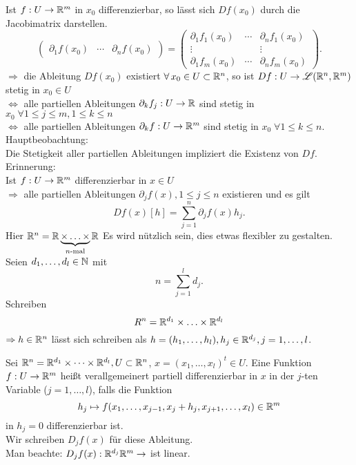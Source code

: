 \documentclass[../ana2.tex]{subfiles}
\begin{document}
Ist \(f:U\rightarrow \mathbb{R}^m \) in \(x_0\) differenzierbar, so lässt 
sich \(Df(x_0)\) durch die Jacobimatrix darstellen.
\[ \begin{pmatrix}
    \partial_1 f(x_0) & \cdots & \partial_n f(x_0)
\end{pmatrix} = \begin{pmatrix}
    \partial_1 f_1(x_0) & \cdots & \partial_n f_1(x_0) \\
    \vdots && \vdots \\
    \partial_1 f_m(x_0) & \cdots & \partial_n f_m(x_0)
\end{pmatrix}. \]
\( \Rightarrow \) die Ableitung \( Df(x_0) \) existiert 
\( \forall x_0 \in U \subset \R^n \), so ist 
\( Df:U\rightarrow \mathscr{L}(\mathbb{R}^n, \mathbb{R}^m) \) 
stetig in \( x_0 \in U \) \\
\( \Leftrightarrow \) alle partiellen Ableitungen 
\( \partial_k f_j:U\rightarrow \mathbb{R} \) sind stetig in 
\(x_0 \; \forall 1 \leq j \leq m, 1 \leq k \leq n \) \\
\( \Leftrightarrow \) alle partiellen Ableitungen 
\( \partial_k f:U\rightarrow \mathbb{R}^m \)
sind stetig in \(x_0 \; \forall 1 \leq k \leq n\).
Hauptbeobachtung:\\
Die Stetigkeit aller partiellen Ableitungen 
impliziert die Existenz von \(Df\).\\
Erinnerung: \\
Ist \(f:U\rightarrow \mathbb{R}^m\)
differenzierbar in \( x\in U \)\\
\( \Rightarrow \) alle partiellen Ableitungen 
\( \partial_j f(x), 1 \leq j \leq n \) existieren
und es gilt
\[ Df(x)[h] = \sum_{j=1}^n \partial_j f(x) h_j. \]
Hier \( \mathbb{R}^n = \mathbb{R} \underbrace{\times \ldots \times}_{n\text{-mal}} \mathbb{R} \)
Es wird nützlich sein, dies etwas flexibler zu 
gestalten.\\
Seien \( d_1, \ldots, d_l \in \mathbb{N} \) mit
\[ n = \sum_{j=1}^l d_j. \]
Schreiben 
\[ R^n = \mathbb{R}^{d_1} \times \ldots \times \mathbb{R}^{d_l} \]
\( \Rightarrow h \in \mathbb{R}^n \) lässt sich schreiben
als \( h = (h_1,\ldots, h_l), h_j \in \mathbb{R}^{d_j}, j=1,\ldots,l \).
\begin{defi}
    Sei \( \mathbb{R}^n = \mathbb{R}^{d_1} \times \dots \times \mathbb{R}^{d_l}, U \subset \mathbb{R}^n \),
    \( x = (x_1, \ldots, x_l)^t \in U \).
    Eine Funktion \( f:U\rightarrow \mathbb{R}^m \) heißt verallgemeinert
    partiell differenzierbar in \(x\) in der \(j\)-ten 
    Variable (\(j = 1, \ldots, l\)), falls die Funktion 
    \[ h_j \mapsto f(x_1,\ldots, x_{j-1}, x_j + h_j, 
    x_{j+1}, \ldots, x_l) \in \mathbb{R}^m \] 
    in \( h_j = 0 \) differenzierbar ist.\\
    Wir schreiben \(D_jf(x)\) für diese Ableitung.\\
    Man beachte: \( D_jf(x):\mathbb{R}^{d_j}{\mathbb{R}^m}\rightarrow \) ist linear.
\end{defi}
\end{document}
